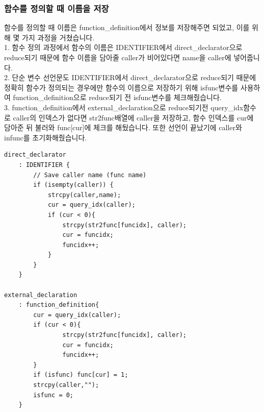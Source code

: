 \documentclass{article}
\begin{document}
            \subsubsection{함수를 정의할 때 이름을 저장}
                함수를 정의할 때 이름은 function\_definition에서 정보를 저장해주면 되었고, 이를 위해 몇 가지 과정을 거쳤습니다.\\
                1. 함수 정의 과정에서 함수의 이름은 IDENTIFIER에서 direct\_declarator으로 reduce되기 때문에 함수 이름을 담아줄 caller가 비어있다면 name을 caller에 넣어줍니다.\\
                2. 단순 변수 선언문도 IDENTIFIER에서 direct\_declarator으로 reduce되기 때문에 정확히 함수가 정의되는 경우에만 함수의 이름으로 저장하기 위해 isfunc변수를 사용하여 function\_definition으로 reduce되기 전
                   isfunc변수를 체크해줬습니다.\\
                3. function\_definition에서 external\_declaration으로 reduce되기전 query\_idx함수로 caller의 인덱스가 없다면 str2func배열에 caller을 저장하고, 함수 인덱스를 cur에 담아준 뒤 
				   불러와 func[cur]에 체크를 해뒀습니다. 또한 선언이 끝났기에 caller와 infunc를 초기화해줬습니다.
			\newpage
			\begin{verbatim}
direct_declarator
	: IDENTIFIER {
		// Save caller name (func name)
        if (isempty(caller)) {
            strcpy(caller,name);
            cur = query_idx(caller);
            if (cur < 0){
                strcpy(str2func[funcidx], caller);
                cur = funcidx;
                funcidx++;
            }
        }
    }

external_declaration 
	: function_definition{
        cur = query_idx(caller);
        if (cur < 0){
                strcpy(str2func[funcidx], caller);
                cur = funcidx;
                funcidx++;
		}
        if (isfunc) func[cur] = 1;
        strcpy(caller,"");
        isfunc = 0;
    }
			\end{verbatim}
\end{document}
